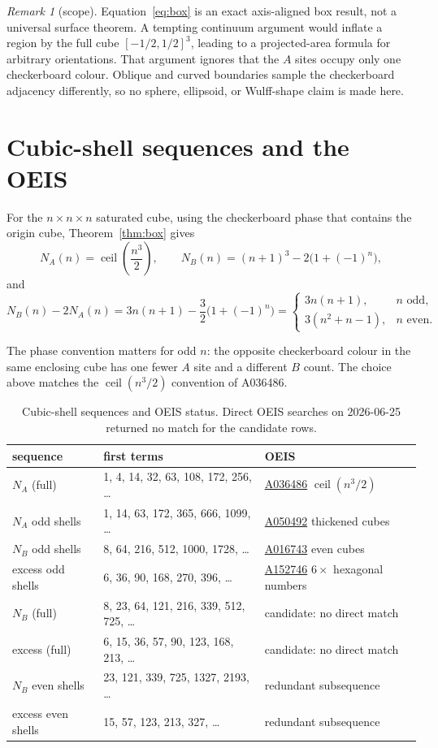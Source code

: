 \documentclass[11pt]{article}
\theoremstyle{plain}
\theoremstyle{definition}
\theoremstyle{remark}
\newtheorem*{remark}{Remark}
\newcommand{\NA}{N_{\!A}}
\newcommand{\NB}{N_{\!B}}
\DeclareMathOperator{\ceil}{ceil}
\begin{document}
\begin{remark}[scope]
Equation~\eqref{eq:box} is an exact axis-aligned box result, not a universal
surface theorem.  A tempting continuum argument would inflate a region by the
full cube $[-1/2,1/2]^3$, leading to a projected-area formula for arbitrary
orientations.  That argument ignores that the $A$ sites occupy only one
checkerboard colour.  Oblique and curved boundaries sample the checkerboard
adjacency differently, so no sphere, ellipsoid, or Wulff-shape claim is made
here.
\end{remark}

\section{Cubic-shell sequences and the OEIS}\label{sec:seq}

For the $n\times n\times n$ saturated cube, using the checkerboard phase that
contains the origin cube, Theorem~\ref{thm:box} gives
\[
\NA(n)=\ceil\!\left(\frac{n^3}{2}\right),
\qquad
\NB(n)=(n+1)^3-2\bigl(1+(-1)^n\bigr),
\]
and
\[
\NB(n)-2\NA(n)=3n(n+1)-\frac32\bigl(1+(-1)^n\bigr)
=
\begin{cases}
3n(n+1), & n\text{ odd},\\[2pt]
3(n^2+n-1), & n\text{ even}.
\end{cases}
\]

The phase convention matters for odd $n$: the opposite checkerboard colour in
the same enclosing cube has one fewer $A$ site and a different $B$ count.  The
choice above matches the $\ceil(n^3/2)$ convention of A036486.

\begin{table}[ht]\centering
\caption{Cubic-shell sequences and OEIS status.  Direct OEIS searches on
2026-06-25 returned no match for the candidate rows.}
\label{tab:seq}\small
\begin{tabular}{@{}lll@{}}
\toprule
sequence & first terms & OEIS \\
\midrule
$\NA$ (full) & 1, 4, 14, 32, 63, 108, 172, 256, \dots &
\href{https://oeis.org/A036486}{A036486} $\ceil(n^3/2)$ \\
$\NA$ odd shells & 1, 14, 63, 172, 365, 666, 1099, \dots &
\href{https://oeis.org/A050492}{A050492} thickened cubes \\
$\NB$ odd shells & 8, 64, 216, 512, 1000, 1728, \dots &
\href{https://oeis.org/A016743}{A016743} even cubes \\
excess odd shells & 6, 36, 90, 168, 270, 396, \dots &
\href{https://oeis.org/A152746}{A152746} $6\times$ hexagonal numbers \\
\midrule
$\NB$ (full) & 8, 23, 64, 121, 216, 339, 512, 725, \dots &
candidate: no direct match \\
excess (full) & 6, 15, 36, 57, 90, 123, 168, 213, \dots &
candidate: no direct match \\
$\NB$ even shells & 23, 121, 339, 725, 1327, 2193, \dots &
redundant subsequence \\
excess even shells & 15, 57, 123, 213, 327, \dots &
redundant subsequence \\
\bottomrule
\end{tabular}
\end{table}
\end{document}
